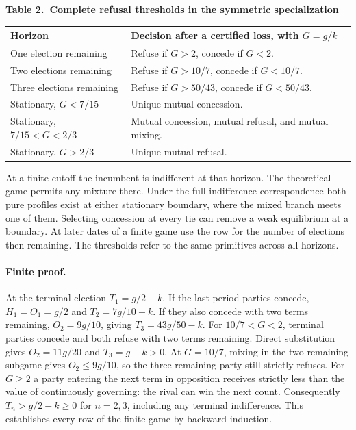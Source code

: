 \documentclass[11pt,letterpaper]{article}
\begin{document}
\begin{center}\small
\textbf{Table 2.\ Complete refusal thresholds in the symmetric specialization}\\[4pt]
\begin{tabular}{@{}ll@{}}\toprule
Horizon & Decision after a certified loss, with \(G=g/k\)\\\midrule
One election remaining & Refuse if \(G>2\), concede if \(G<2\).\\
Two elections remaining & Refuse if \(G>10/7\), concede if \(G<10/7\).\\
Three elections remaining & Refuse if \(G>50/43\), concede if \(G<50/43\).\\[2pt]
Stationary, \(G<7/15\) & Unique mutual concession.\\
Stationary, \(7/15<G<2/3\) & Mutual concession, mutual refusal, and mutual mixing.\\
Stationary, \(G>2/3\) & Unique mutual refusal.\\\bottomrule
\end{tabular}
\end{center}

At a finite cutoff the incumbent is indifferent at that horizon. The theoretical game permits any mixture there. Under the full indifference correspondence both pure profiles exist at either stationary boundary, where the mixed branch meets one of them. Selecting concession at every tie can remove a weak equilibrium at a boundary. At later dates of a finite game use the row for the number of elections then remaining. The thresholds refer to the same primitives across all horizons.

\paragraph{Finite proof.}
At the terminal election \(T_1=g/2-k\). If the last-period parties concede, \(H_1=O_1=g/2\) and \(T_2=7g/10-k\). If they also concede with two terms remaining, \(O_2=9g/10\), giving \(T_3=43g/50-k\). For \(10/7<G<2\), terminal parties concede and both refuse with two terms remaining. Direct substitution gives \(O_2=11g/20\) and \(T_3=g-k>0\). At \(G=10/7\), mixing in the two-remaining subgame gives \(O_2\le9g/10\), so the three-remaining party still strictly refuses. For \(G\ge2\) a party entering the next term in opposition receives strictly less than the value of continuously governing: the rival can win the next count. Consequently \(T_n>g/2-k\ge0\) for \(n=2,3\), including any terminal indifference. This establishes every row of the finite game by backward induction.
\end{document}
